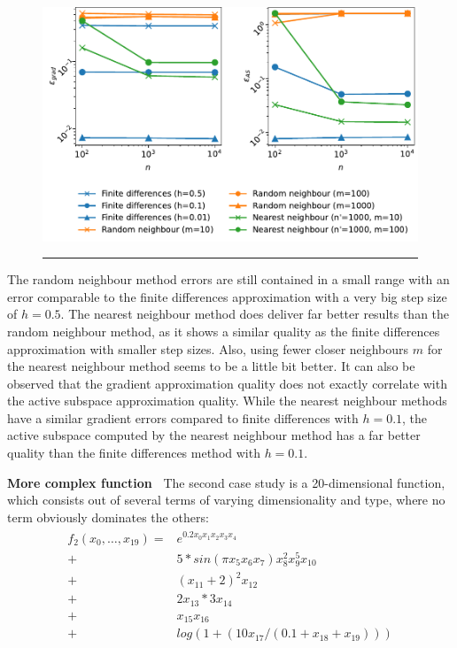 \documentclass[
  a4paper,  %
  twoside,  %
  bibliography=totoc,
  headsepline,
  cleardoublepage=empty,
  parskip=half,
  draft=false
]{scrbook}
\newcommand{\delimit}{{\color{charcoal}\noindent\rule{\textwidth}{1pt}}}
\begin{document}
\newpage
\begin{mdframed}[style=style]
\begin{figure}[H]
\centering
	\includegraphics[width=\textwidth]{graphics/as_errors_f1}
\delimit
	\label{fig:as_errors_f1}
\end{figure}
\end{mdframed}

The random neighbour method errors are still contained in a small range with an error comparable to the finite differences approximation with a very big step size of $h=0.5$.
The nearest neighbour method does deliver far better results than the random neighbour method, as it shows a similar quality as the finite differences approximation with smaller step sizes.
Also, using fewer closer neighbours $m$ for the nearest neighbour method seems to be a little bit better.
It can also be observed that the gradient approximation quality does not exactly correlate with the active subspace approximation quality.
While the nearest neighbour methods have a similar gradient errors compared to finite differences with $h=0.1$, the active subspace computed by the nearest neighbour method has a far better quality than the finite differences method with $h=0.1$.

\vspace{2mm}
\textbf{More complex function~}
The second case study is a 20-dimensional function, which consists out of several terms of varying dimensionality and type, where no term obviously dominates the others:
\begin{align}
\begin{split}
f_2(x_0, \dots, x_{19})=&e^{0.2 x_0 x_1 x_2 x_3 x_4}\\
+ &5 * sin(\pi x_5 x_6 x_7) x_8^2 x_9^5 x_{10}\\
+ &(x_{11} + 2)^2 x_{12}\\
+ &2 x_{13} * 3 x_{14}\\
+ &x_{15} x_{16}\\
+ &log(1 + (10 x_{17} / (0.1 + x_{18} + x_{19})))
\end{split}
\end{align}
\end{document}
